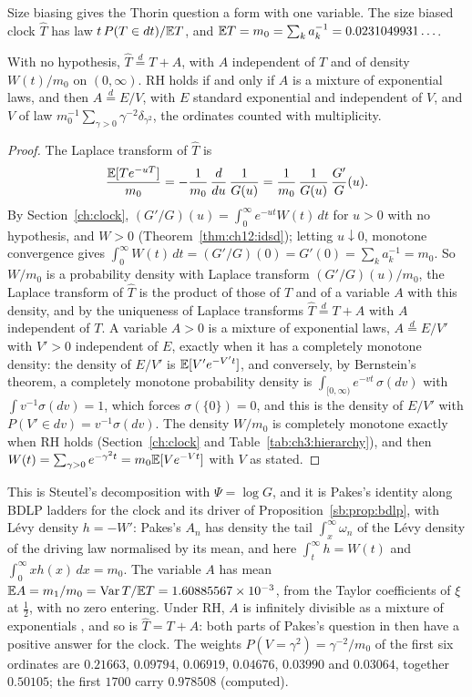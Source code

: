 Size biasing gives the Thorin question a form with one variable. The size biased clock $\widehat T$ has law $t\,P(T\in dt)/\mathbb{E} T$, and $\mathbb{E} T=m_0=\sum_ka_k^{-1}=0.0231049931\ldots$.

\begin{proposition}\label{pk:prop:sizebias}
With no hypothesis, $\widehat T\stackrel d=T+A$, with $A$ independent of $T$ and of density $W(t)/m_0$ on $(0,\infty)$. RH holds if and only if $A$ is a mixture of exponential laws, and then $A\stackrel d=E/V$, with $E$ standard exponential and independent of $V$, and $V$ of law $m_0^{-1}\sum_{\gamma>0}\gamma^{-2}\delta_{\gamma^2}$, the ordinates counted with multiplicity.
\end{proposition}

\begin{proof}
The Laplace transform of $\widehat T$ is
\[
\frac{\mathbb{E}[Te^{-uT}]}{m_0}=-\frac1{m_0}\,\frac d{du}\,\frac1{G(u)}=\frac1{m_0}\,\frac1{G(u)}\,\frac{G'}G(u).
\]
By Section~\ref{ch:clock}, $(G'/G)(u)=\int_0^\infty e^{-ut}W(t)\,dt$ for $u>0$ with no hypothesis, and $W>0$ (Theorem~\ref{thm:ch12:idsd}); letting $u\downarrow0$, monotone convergence gives $\int_0^\infty W(t)\,dt=(G'/G)(0)=G'(0)=\sum_ka_k^{-1}=m_0$. So $W/m_0$ is a probability density with Laplace transform $(G'/G)(u)/m_0$, the Laplace transform of $\widehat T$ is the product of those of $T$ and of a variable $A$ with this density, and by the uniqueness of Laplace transforms $\widehat T\stackrel d=T+A$ with $A$ independent of $T$. A variable $A>0$ is a mixture of exponential laws, $A\stackrel d=E/V'$ with $V'>0$ independent of $E$, exactly when it has a completely monotone density: the density of $E/V'$ is $\mathbb{E}[V'e^{-V't}]$, and conversely, by Bernstein's theorem, a completely monotone probability density is $\int_{[0,\infty)}e^{-vt}\,\sigma(dv)$ with $\int v^{-1}\sigma(dv)=1$, which forces $\sigma(\{0\})=0$, and this is the density of $E/V'$ with $P(V'\in dv)=v^{-1}\sigma(dv)$. The density $W/m_0$ is completely monotone exactly when RH holds (Section~\ref{ch:clock} and Table~\ref{tab:ch3:hierarchy}), and then $W(t)=\sum_{\gamma>0}e^{-\gamma^2t}=m_0\mathbb{E}[Ve^{-Vt}]$ with $V$ as stated.
\end{proof}

This is Steutel's decomposition with $\Psi=\log G$, and it is Pakes's identity along BDLP ladders \cite[(53)]{Pakes26} for the clock and its driver of Proposition~\ref{sb:prop:bdlp}, with L\'evy density $h=-W'$: Pakes's $A_n$ has density the tail $\int_x^\infty\omega_n$ of the L\'evy density of the driving law normalised by its mean, and here $\int_t^\infty h=W(t)$ and $\int_0^\infty xh(x)\,dx=m_0$. The variable $A$ has mean $\mathbb{E} A=m_1/m_0=\mathrm{Var}\,T/\mathbb{E} T=1.60885567\times10^{-3}$, from the Taylor coefficients of $\xi$ at $\frac12$, with no zero entering. Under RH, $A$ is infinitely divisible as a mixture of exponentials \cite{Goldie67,Steutel67}, and so is $\widehat T=T+A$: both parts of Pakes's question in \cite{Pakes14} then have a positive answer for the clock. The weights $P(V=\gamma^2)=\gamma^{-2}/m_0$ of the first six ordinates are $0.21663$, $0.09794$, $0.06919$, $0.04676$, $0.03990$ and $0.03064$, together $0.50105$; the first $1700$ carry $0.978508$ (computed).

